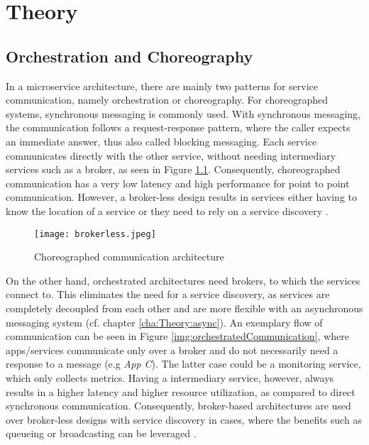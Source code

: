 
\chapter{Theory}\label{cha:Theory}

\section{Orchestration and Choreography}\label{cha:Theory:orchestrationchoreography}

In a microservice architecture, there are mainly two patterns for service communication, namely orchestration or choreography.
For choreographed systems, synchronous messaging is commonly used.
With synchronous messaging, the communication follows a request-response pattern, where the caller expects an immediate answer, thus also called blocking messaging.
Each service communicates directly with the other service, without needing intermediary services such as a broker, as seen in Figure \ref{img:choreographedCommunication}.
Consequently, choreographed communication has a very low latency and high performance for point to point communication.
However, a broker-less design results in services either having to know the location of a service or they need to rely on a service discovery \cite{NoorainPanjwani.2020}\cite{Rudrabhatla.2018}.
\begin{figure}[h]
	\centering
	\texttt{[image: brokerless.jpeg]}
	\caption{Choreographed communication architecture \cite{NoorainPanjwani.2020}}
	\label{img:choreographedCommunication}
\end{figure}

On the other hand, orchestrated architectures need brokers, to which the services connect to.
This eliminates the need for a service discovery, as services are completely decoupled from each other and are more flexible with an asynchronous messaging system (cf. chapter \ref{cha:Theory:async}).
An exemplary flow of communication can be seen in Figure \ref{img:orchestratedCommunication}, where apps/services communicate only over a broker and do not necessarily need a response to a message (e.g \textit{App C}).
The latter case could be a monitoring service, which only collects metrics.
Having a intermediary service, however, always results in a higher latency and higher resource utilization, as compared to direct synchronous communication.
Consequently, broker-based architectures are used over broker-less designs with service discovery in cases, where the benefits such as queueing or broadcasting can be leveraged \cite{Rudrabhatla.2018}\cite{Giro.2019}.

